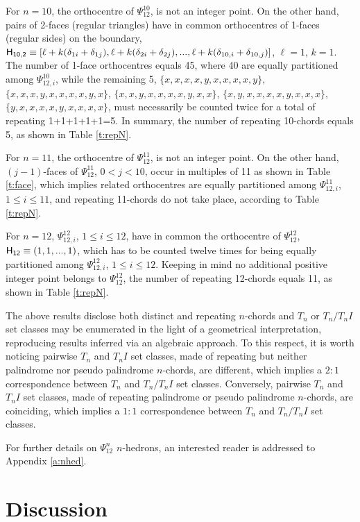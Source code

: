 \documentclass[12pt,a4paper]{article}
\begin{document}
For $n=10$, the orthocentre of $\Psi_{12}^{10}$, is not an integer point.  On
the other hand, pairs of 2-faces (regular triangles) have in common
orthocentres of 1-faces (regular sides) on
the boundary, ${\sf H_{10,2}}\equiv[\ell+k(\delta_{1i}+\delta_{1j}),
\ell+k(\delta_{2i}+\delta_{2j}),...,\ell+k(\delta_{10,i}+\delta_{10,j})]$,
$\ell=1$, $k=1$.   The number of 1-face orthocentres equals 45,
where 40 are equally partitioned among $\Psi_{12,i}^{10}$, while the remaining
5, $\{x,x,x,x,y,x,x,x,x,y\}$, $\{x,x,x,y,x,x,x,x,y,x\}$,
$\{x,x,y,x,x,x,x,y,x,x\}$, $\{x,y,x,x,x,x,y,x,x,x\}$,
$\{y,x,x,x,x,y,x,x,x,x\}$, must necessarily be counted twice for a total of
repeating 1+1+1+1+1=5.   In summary, the number of
repeating 10-chords equals 5, as shown in Table \ref{t:repN}. 

For $n=11$, the orthocentre of $\Psi_{12}^{11}$, is not an integer point.   On
the other hand, $(j-1)$-faces of  $\Psi_{12}^{11}$, $0<j<10$, occur in
multiples
of 11 as shown in Table \ref{t:face}, which implies related orthocentres are
equally partitioned among $\Psi_{12,i}^{11}$, $1\le i\le11$, and repeating
11-chords do not take place, according to Table \ref{t:repN}.

For $n=12$, $\Psi_{12,i}^{12}$, $1\le i\le12$, have in common the orthocentre
of $\Psi_{12}^{12}$, ${\sf H_{12}}\equiv(1,1,...,1)$, which has to be counted
twelve times for being equally partitioned among $\Psi_{12,i}^{12}$,
$1\le i\le12$.  Keeping in mind no additional positive integer point belongs
to $\Psi_{12}^{12}$, the number of repeating 12-chords equals 11, as shown
in Table \ref{t:repN}.

The above results disclose both distinct and repeating $n$-chords and $T_n$
or $T_n/T_nI$ set classes may be enumerated in the light of a geometrical
interpretation, reproducing results inferred via an algebraic approach.   To
this respect, it is worth noticing pairwise $T_n$ and $T_nI$ set classes, made
of repeating but neither palindrome nor pseudo palindrome $n$-chords, are
different, which implies a $2:1$ correspondence between $T_n$ and $T_n/T_nI$
set classes.   Conversely, pairwise $T_n$ and $T_nI$ set classes, made of
repeating palindrome or pseudo palindrome $n$-chords, are coinciding, which
implies a $1:1$ correspondence between $T_n$ and $T_n/T_nI$ set classes.

For further details on $\Psi_{12}^n$ $n$-hedrons, an interested reader is
addressed to Appendix \ref{a:nhed}.

\section{Discussion}\label{disc}
\end{document}

